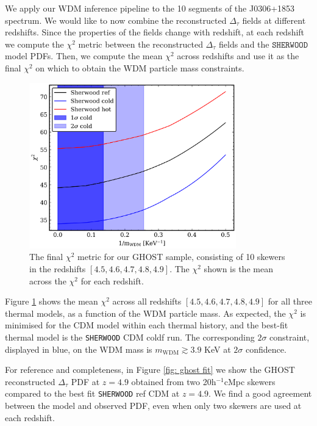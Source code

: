 We apply our WDM inference pipeline to the 10 segments of the J0306+1853 spectrum. We would like to now combine the reconstructed $\Delta_\tau$ fields at different redshifts. Since the properties of the fields change with redshift, at each redshift we compute the $\chi^2$ metric between the reconstructed $\Delta_\tau$ fields and the $\texttt{SHERWOOD}$ model PDFs. Then, we compute the mean $\chi^2$ across redshifts and use it as the final $\chi^2$ on which to obtain the WDM particle mass constraints.

\begin{figure}[ht!]
    \centering
    \includegraphics[width=0.8\textwidth]{img/ML/GHOST_chi.png}
    \caption{The final $\chi^2$ metric for our GHOST sample, consisting of 10 skewers in the redshifts $[4.5, 4.6, 4.7, 4.8, 4.9]$. The $\chi^2$ shown is the mean across the $\chi^2$ for each redshift.}
    \label{fig: ghost chi}
\end{figure}
Figure \ref{fig: ghost chi} shows the mean $\chi^2$ across all redshifts $[4.5, 4.6, 4.7, 4.8, 4.9]$ for all three thermal models, as a function of the WDM particle mass. As expected, the $\chi^2$ is minimised for the CDM model within each thermal history, and the best-fit thermal model is the \texttt{SHERWOOD} CDM coldf run. The corresponding $2\sigma$ constraint, displayed in blue, on the WDM mass is $m_{\mathrm{WDM}} \gtrsim 3.9$ KeV at $2\sigma$ confidence.

For reference and completeness, in Figure \ref{fig: ghost fit} we show the GHOST reconstructed $\Delta_\tau$ PDF at $z=4.9$ obtained from two 20h$^{-1}$cMpc skewers compared to the best fit \texttt{SHERWOOD} ref CDM at $z=4.9$. We find a good agreement between the model and observed PDF, even when only two skewers are used at each redshift.

